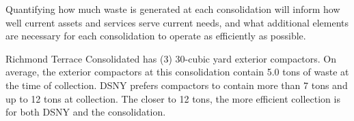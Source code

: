 
    Quantifying how much waste is generated at each consolidation will inform how well current assets and services serve current needs, and what additional elements are necessary for each consolidation to operate as efficiently as possible.
    
    Richmond Terrace Consolidated has (3) 30-cubic yard exterior compactors. On average, the exterior compactors at this consolidation contain 5.0 tons of waste at the time of collection. DSNY prefers compactors to contain more than 7 tons and up to 12 tons at collection. The closer to 12 tons, the more efficient collection is for both DSNY and the consolidation.